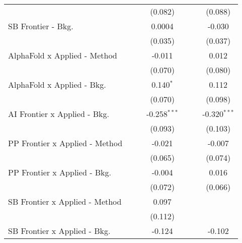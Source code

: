 \begin{tabular}{lcccccc}
                                  &              &              & (0.082)        &             &               & (0.088)\\   
   SB Frontier - Bkg.             &              &              & 0.0004         &             &               & -0.030\\   
                                  &              &              & (0.035)        &             &               & (0.037)\\   
   AlphaFold x Applied - Method   &              &              & -0.011         &             &               & 0.012\\   
                                  &              &              & (0.070)        &             &               & (0.080)\\   
   AlphaFold x Applied - Bkg.     &              &              & 0.140$^{*}$    &             &               & 0.112\\   
                                  &              &              & (0.070)        &             &               & (0.098)\\   
   AI Frontier x Applied - Bkg.   &              &              & -0.258$^{***}$ &             &               & -0.320$^{***}$\\   
                                  &              &              & (0.093)        &             &               & (0.103)\\   
   PP Frontier x Applied - Method &              &              & -0.021         &             &               & -0.007\\   
                                  &              &              & (0.065)        &             &               & (0.074)\\   
   PP Frontier x Applied - Bkg.   &              &              & -0.004         &             &               & 0.016\\   
                                  &              &              & (0.072)        &             &               & (0.066)\\   
   SB Frontier x Applied - Method &              &              & 0.097          &             &               &   \\   
                                  &              &              & (0.112)        &             &               &   \\   
   SB Frontier x Applied - Bkg.   &              &              & -0.124         &             &               & -0.102\\   

\end{tabular}

